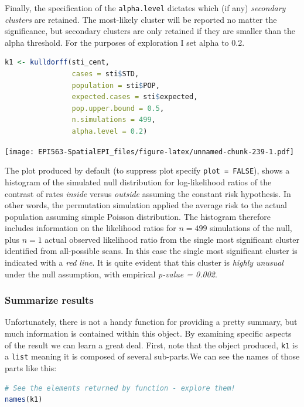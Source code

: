 \documentclass[
]{book}
\newcommand{\passthrough}[1]{#1}
\begin{document}
Finally, the specification of the \passthrough{\lstinline!alpha.level!} dictates which (if any) \emph{secondary clusters} are retained. The most-likely cluster will be reported no matter the significance, but secondary clusters are only retained if they are smaller than the alpha threshold. For the purposes of exploration I set alpha to 0.2.

\begin{lstlisting}[language=R]
k1 <- kulldorff(sti_cent, 
                cases = sti$STD,
                population = sti$POP,
                expected.cases = sti$expected,
                pop.upper.bound = 0.5,
                n.simulations = 499,
                alpha.level = 0.2)
\end{lstlisting}

\texttt{[image: EPI563-SpatialEPI\_files/figure-latex/unnamed-chunk-239-1.pdf]}

The plot produced by default (to suppress plot specify \passthrough{\lstinline!plot = FALSE!}), shows a histogram of the simulated null distribution for log-likelihood ratios of the contrast of rates \emph{inside} versus \emph{outside} assuming the constant risk hypothesis. In other words, the permutation simulation applied the average risk to the actual population assuming simple Poisson distribution. The histogram therefore includes information on the likelihood ratios for \(n=499\) simulations of the null, plus \(n=1\) actual observed likelihood ratio from the single most significant cluster identified from all-possible scans. In this case the single most significant cluster is indicated with a \emph{red line}. It is quite evident that this cluster is \emph{highly unusual} under the null assumption, with empirical \emph{p-value = 0.002}.

\hypertarget{summarize-results}{%
\subsubsection{Summarize results}\label{summarize-results}}

Unfortunately, there is not a handy function for providing a pretty summary, but much information is contained within this object. By examining specific aspects of the result we can learn a great deal. First, note that the object produced, \passthrough{\lstinline!k1!} is a \passthrough{\lstinline!list!} meaning it is composed of several sub-parts.We can see the names of those parts like this:

\begin{lstlisting}[language=R]
# See the elements returned by function - explore them!
names(k1) 
\end{lstlisting}
\end{document}

